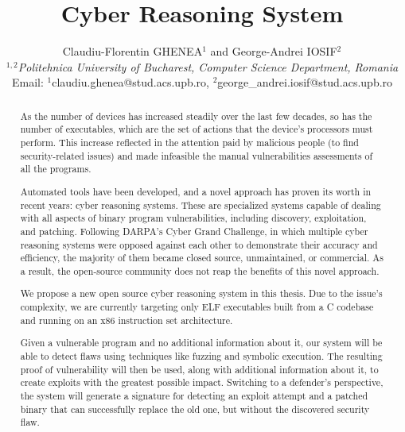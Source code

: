 \documentclass[12pt,a4paper,english,onecolumn]{IEEEtran}
\begin{document}
\title{Cyber Reasoning System}

\author{Claudiu-Florentin GHENEA$^{1}$ and George-Andrei IOSIF$^{2}$\\
$^{1,2}$\emph{Politehnica University of Bucharest, Computer Science Department, Romania}\\
Email: $^{1}$claudiu.ghenea@stud.acs.upb.ro, $^{2}$george\_andrei.iosif@stud.acs.upb.ro}

\maketitle

\begin{abstract}

As the number of devices has increased steadily over the last few decades, so has the number of executables, which are the set of actions that the device's processors must perform. This increase reflected in the attention paid by malicious people (to find security-related issues) and made infeasible the manual vulnerabilities assessments of all the programs.

Automated tools have been developed, and a novel approach has proven its worth in recent years: cyber reasoning systems. These are specialized systems capable of dealing with all aspects of binary program vulnerabilities, including discovery, exploitation, and patching. Following DARPA's Cyber Grand Challenge, in which multiple cyber reasoning systems were opposed against each other to demonstrate their accuracy and efficiency, the majority of them became closed source, unmaintained, or commercial. As a result, the open-source community does not reap the benefits of this novel approach.

We propose a new open source cyber reasoning system in this thesis. Due to the issue's complexity, we are currently targeting only ELF executables built from a C codebase and running on an x86 instruction set architecture.

Given a vulnerable program and no additional information about it, our system will be able to detect flaws using techniques like fuzzing and symbolic execution. The resulting proof of vulnerability will then be used, along with additional information about it, to create exploits with the greatest possible impact. Switching to a defender's perspective, the system will generate a signature for detecting an exploit attempt and a patched binary that can successfully replace the old one, but without the discovered security flaw.

\end{abstract}
\end{document}
